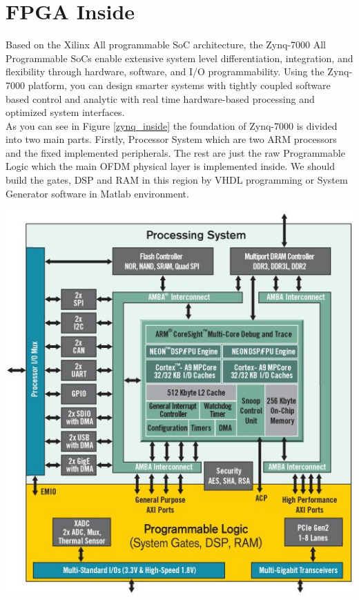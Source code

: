 \section{FPGA Inside}
Based on the Xilinx All programmable SoC architecture, the Zynq-7000 All Programmable SoCs enable extensive system level differentiation, integration, and flexibility through hardware, software, and I/O programmability. Using the Zynq-7000 platform, you can design smarter systems with tightly coupled software based control and analytic with real time hardware-based processing and optimized system interfaces.\\
As you can see in Figure \ref{zynq_inside} the foundation of Zynq-7000 is divided into two main parts. Firstly, Processor System which are two ARM processors and the fixed implemented peripherals. The rest are just the raw Programmable Logic which the main OFDM physical layer is implemented inside. We should build the gates, DSP and RAM in this region by VHDL programming or System Generator software in Matlab environment.\\


\begin{center}
\includegraphics[width=\textwidth]{content/fig/zynq_inside.JPG}
\label{zynq_inside}
\end{center}

